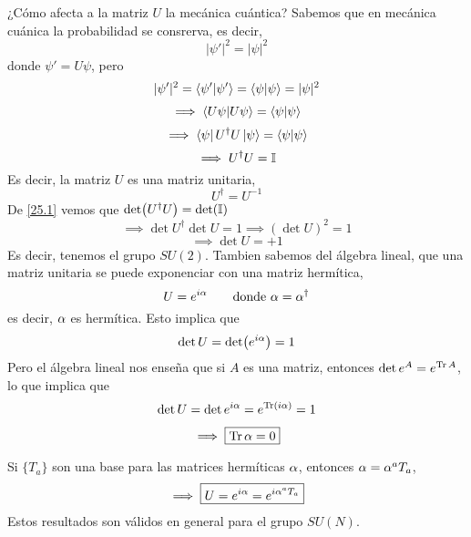 ¿Cómo afecta a la matriz $U$ la mecánica cuántica? Sabemos que en mecánica cuánica la probabilidad se consrerva, es decir,
\begin{equation}
  |\psi'|^2=|\psi|^2
\end{equation}
donde $\psi'=U\psi$, pero
\begin{align}
  |\psi'|^2=\bra{\psi'}\ket{\psi'}=\braket{\psi}=|\psi|^2
\end{align}
\begin{equation}
  \implies \braket{U\psi}=\braket{\psi}
\end{equation}
\begin{equation}
  \implies \bra{\psi}U^\dagger U\ket{\psi}=\braket{\psi}
\end{equation}
\begin{equation}\label{25.1}
  \implies U^\dagger U=\mathbb{I} 
\end{equation}
Es decir, la matriz $U$ es una matriz unitaria,
\begin{equation}
  U^\dagger=U^{-1}
\end{equation}
De \eqref{25.1} vemos que $\det(U^\dagger U)=\det(\mathbb{I} )$
\begin{equation}
  \implies \det U^\dagger \det U=1 \implies (\det U)^2=1
\end{equation}
\begin{equation}
  \implies \det U=+1
\end{equation}
Es decir, tenemos el grupo $SU(2)$. Tambien sabemos del álgebra lineal, que una matriz unitaria se puede exponenciar con una matriz hermítica,
\begin{equation}
  U=e^{i\alpha }\qquad \text{donde } \alpha=\alpha^\dagger
\end{equation}
es decir, $\alpha$ es hermítica. Esto implica que
\begin{equation}
  \det U=\det (e^{i\alpha })=1
\end{equation}
Pero el álgebra lineal nos enseña que si $A$ es una matriz, entonces $\det e^{A}=e^{\Tr A}$, lo que implica que
\begin{align}
  \det U=\det e^{i\alpha }=e^{\Tr (i\alpha )}=1
\end{align}
\begin{equation}
  \implies \boxed{\Tr \alpha =0}
\end{equation}

Si $\{T_a\}$ son una base para las matrices hermíticas $\alpha$, entonces $\alpha=\alpha^{a}T_a$,
\begin{equation}
  \implies \boxed{U=e^{i\alpha }=e^{i\alpha^{a}T_a}}
\end{equation}
Estos resultados son válidos en general para el grupo $SU(N)$.

